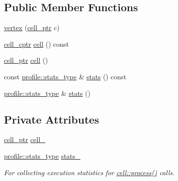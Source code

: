 \subsection*{Public Member Functions}
\begin{DoxyCompactItemize}
\item 
\hyperlink{classecto_1_1graph_1_1vertex_a18cea5500866c9d86ce252e84d3881c6}{vertex} (\hyperlink{namespaceecto_aed1809e82b9229ea81ef9ee3438cf62c}{cell\-\_\-ptr} c)
\item 
\hyperlink{namespaceecto_ab708c826226c91fd6f3c8c121f293a78}{cell\-\_\-cptr} \hyperlink{classecto_1_1graph_1_1vertex_aa5876238d51eb82bed7a17414bd74132}{cell} () const 
\item 
\hyperlink{namespaceecto_aed1809e82b9229ea81ef9ee3438cf62c}{cell\-\_\-ptr} \hyperlink{classecto_1_1graph_1_1vertex_a7b2bed5e1305cc26855c5bc8bc6884df}{cell} ()
\item 
const \hyperlink{structecto_1_1profile_1_1stats__type}{profile\-::stats\-\_\-type} \& \hyperlink{classecto_1_1graph_1_1vertex_a38bfe554aa3f8413769be22dff0ea2c3}{stats} () const 
\item 
\hyperlink{structecto_1_1profile_1_1stats__type}{profile\-::stats\-\_\-type} \& \hyperlink{classecto_1_1graph_1_1vertex_a522f60e25aa0d769b3826911e0c69d6f}{stats} ()
\end{DoxyCompactItemize}
\subsection*{Private Attributes}
\begin{DoxyCompactItemize}
\item 
\hyperlink{namespaceecto_aed1809e82b9229ea81ef9ee3438cf62c}{cell\-\_\-ptr} \hyperlink{classecto_1_1graph_1_1vertex_a14485eadc4288f5d4e5e32e6b5218ec7}{cell\-\_\-}
\item 
\hyperlink{structecto_1_1profile_1_1stats__type}{profile\-::stats\-\_\-type} \hyperlink{classecto_1_1graph_1_1vertex_abf79016904200297ba32e42534c8ac53}{stats\-\_\-}
\begin{DoxyCompactList}\small\item\em For collecting execution statistics for \hyperlink{structecto_1_1cell_a6b810671ee21f5dddbc1206abfb999f3}{cell\-::process()} calls. \end{DoxyCompactList}\end{DoxyCompactItemize}


